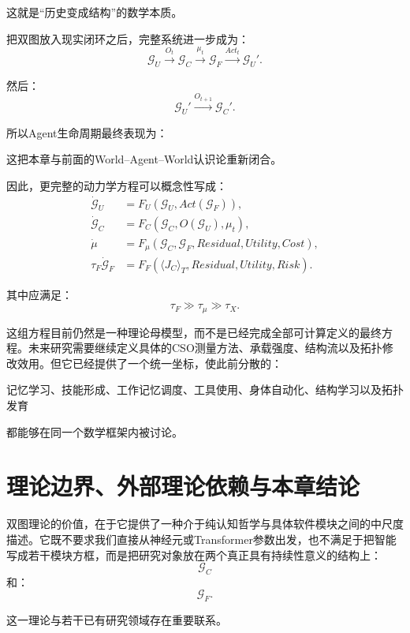 这就是“历史变成结构”的数学本质。

把双图放入现实闭环之后，完整系统进一步成为：
\[
\mathcal G_U
\xrightarrow{O_t}
\mathcal G_C
\xrightarrow{\mu_t}
\mathcal G_F
\xrightarrow{Act_t}
\mathcal G_U'.
\]

然后：
\[
\mathcal G_U'
\xrightarrow{O_{t+1}}
\mathcal G_C'.
\]

所以Agent生命周期最终表现为：
\begin{statementbox}
\centering
{}
\end{statementbox}

这把本章与前面的World--Agent--World认识论重新闭合。

因此，更完整的动力学方程可以概念性写成：
\[
\begin{aligned}
\dot{\mathcal G}_U
&=
F_U
(
\mathcal G_U,
Act(\mathcal G_F)
),\\
\dot{\mathcal G}_C
&=
F_C
(
\mathcal G_C,
O(\mathcal G_U),
\mu_t
),\\
\dot{\mu}
&=
F_\mu
(
\mathcal G_C,
\mathcal G_F,
Residual,
Utility,
Cost
),\\
\tau_F\dot{\mathcal G}_F
&=
F_F
(
\langle J_C\rangle_T,
Residual,
Utility,
Risk
).
\end{aligned}
\]

其中应满足：
\[
\tau_F
\gg
\tau_\mu
\gg
\tau_X.
\]

这组方程目前仍然是一种理论母模型，而不是已经完成全部可计算定义的最终方程。未来研究需要继续定义具体的CSO测量方法、承载强度、结构流以及拓扑修改效用。但它已经提供了一个统一坐标，使此前分散的：

记忆学习、技能形成、工作记忆调度、工具使用、身体自动化、结构学习以及拓扑发育

都能够在同一个数学框架内被讨论。

\section{理论边界、外部理论依赖与本章结论}

双图理论的价值，在于它提供了一种介于纯认知哲学与具体软件模块之间的中尺度描述。它既不要求我们直接从神经元或Transformer参数出发，也不满足于把智能写成若干模块方框，而是把研究对象放在两个真正具有持续性意义的结构上：
\[
\boxed{
\mathcal G_C
}
\]
和：
\[
\boxed{
\mathcal G_F.
}
\]

这一理论与若干已有研究领域存在重要联系。

